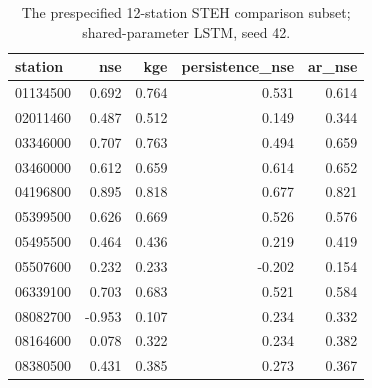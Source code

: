 \begin{table}[tb]
\caption{The prespecified 12-station STEH comparison subset; shared-parameter LSTM, seed 42.}
\label{tab:lstm-steh-subset}
\begin{tabular}{lrrrr}
\toprule
station & nse & kge & persistence_nse & ar_nse \\
\midrule
01134500 & 0.692 & 0.764 & 0.531 & 0.614 \\
02011460 & 0.487 & 0.512 & 0.149 & 0.344 \\
03346000 & 0.707 & 0.763 & 0.494 & 0.659 \\
03460000 & 0.612 & 0.659 & 0.614 & 0.652 \\
04196800 & 0.895 & 0.818 & 0.677 & 0.821 \\
05399500 & 0.626 & 0.669 & 0.526 & 0.576 \\
05495500 & 0.464 & 0.436 & 0.219 & 0.419 \\
05507600 & 0.232 & 0.233 & -0.202 & 0.154 \\
06339100 & 0.703 & 0.683 & 0.521 & 0.584 \\
08082700 & -0.953 & 0.107 & 0.234 & 0.332 \\
08164600 & 0.078 & 0.322 & 0.234 & 0.382 \\
08380500 & 0.431 & 0.385 & 0.273 & 0.367 \\
\bottomrule
\end{tabular}
\end{table}
